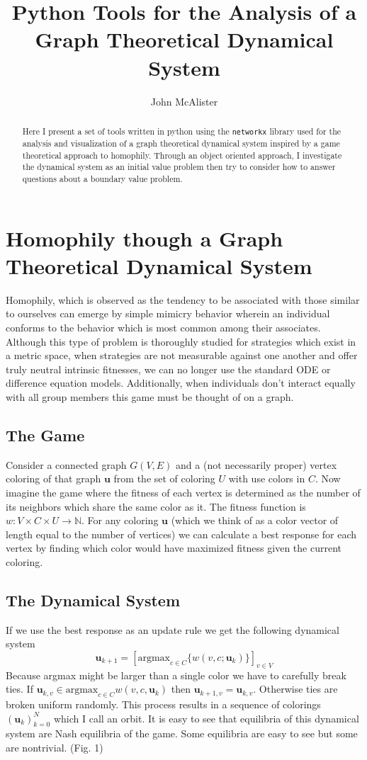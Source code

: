 \documentclass[]{article}
\title{Python Tools for the Analysis of a Graph Theoretical Dynamical System}
\author{John McAlister}
\begin{document}
\maketitle

\begin{abstract}
Here I present a set of tools written in python using the \verb*|networkx| library used for the analysis and visualization of a graph theoretical dynamical system inspired by a game theoretical approach to homophily. Through an object oriented approach, I investigate the dynamical system as an initial value problem then try to consider how to answer questions about a boundary value problem.
\end{abstract}

\section{Homophily though a Graph Theoretical Dynamical System}
Homophily, which is observed as the tendency to be associated with those similar to ourselves can emerge by simple mimicry behavior wherein an individual conforms to the behavior which is most common among their associates. Although this type of problem is thoroughly studied for strategies which exist in a metric space, when strategies are not measurable against one another and offer truly neutral intrinsic fitnesses, we can no longer use the standard ODE or difference equation models. Additionally, when individuals don't interact equally with all group members this game must be thought of on a graph. 
\subsection{The Game}
	Consider a connected graph $G(V,E)$ and a (not necessarily proper) vertex coloring of that graph $\mathbf{u}$ from the set of coloring $U$ with use colors in $C$. Now imagine the game where the fitness of each vertex is determined as the number of its neighbors which share the same color as it. The fitness function is $w:V\times C\times U\rightarrow \mathbb{N}$.
	For any coloring $\mathbf{u}$ (which we think of as a color vector of length equal to the number of vertices) we can calculate a best response for each vertex by finding which color would have maximized fitness given the current coloring. 
\subsection{The Dynamical System}
	If we use the best response as an update rule we get the following dynamical system
\begin{equation}
	\mathbf{u}_{k+1}=[\text{argmax}_{c\in C}\{w(v,c;\mathbf{u}_k)\} ]_{v\in V}
\end{equation}
Because argmax might be larger than a single color we have to carefully break ties. If $\mathbf{u}_{k,v}\in \text{argmax}_{c\in C}{w(v,c,\mathbf{u}_k)}$ then $\mathbf{u}_{k+1,v}=\mathbf{u}_{k,v}$. Otherwise ties are broken uniform randomly. This process results in a sequence of colorings $(\mathbf{u}_k)_{k=0}^N$ which I call an orbit. It is easy to see that equilibria of this dynamical system are Nash equilibria of the game. Some equilibria are easy to see but some are nontrivial. (Fig. 1)
\end{document}
